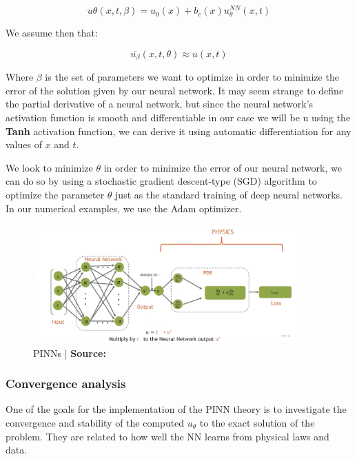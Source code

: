 \documentclass{article}
\begin{document}
$$
u\theta(x,t,\beta) = u_0(x) + b_c(x) u_\theta^{NN}(x,t)
$$

We assume then that:

$$\overline{u_\beta}(x,t,\theta)\approx u(x,t)$$ 

Where $\beta$ is the set of parameters we want to optimize in order to minimize the error of the solution given by our neural network.
It may seem strange to define the partial derivative of a neural network, but since the neural network's activation function is smooth and differentiable in our case we will be u
using the \textbf{Tanh} activation function, we can derive it using automatic differentiation for any values of $x$ and $t$.

We look to minimize $\theta$ in order to minimize the error of our neural network, we can do so by using  a stochastic gradient descent-type (SGD) algorithm to optimize the parameter $\theta$ just 
as the standard training of deep neural networks. In our numerical examples, we use the Adam optimizer.


\begin{figure}[H]
    \centering
    \includegraphics[width=0.9\textwidth]{images/loss.jpg}
    \caption{PINNs | \textbf{Source:} }
\end{figure}

\subsubsection{Convergence analysis}
One of the goals for the implementation of the PINN theory is to investigate the convergence and stability of the computed $u_\theta$ to the exact solution of the problem. They are related to how well the NN learns from physical laws and data.

\end{document}

